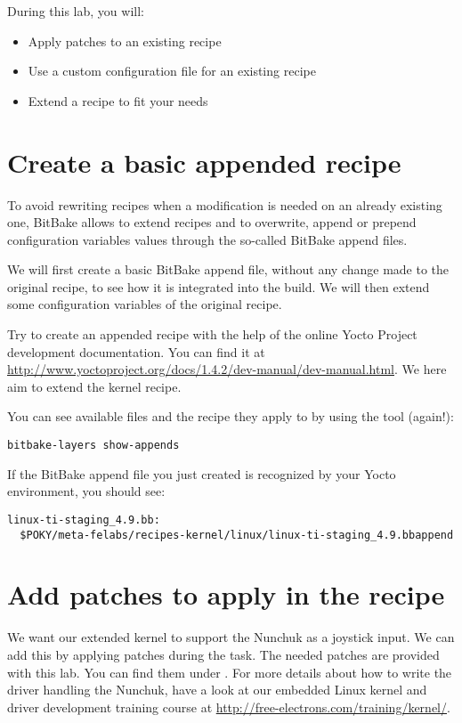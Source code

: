 
During this lab, you will:
\begin{itemize}
  \item Apply patches to an existing recipe
  \item Use a custom configuration file for an existing recipe
  \item Extend a recipe to fit your needs
\end{itemize}

\section{Create a basic appended recipe}

To avoid rewriting recipes when a modification is needed on an already existing
one, BitBake allows to extend recipes and to overwrite, append or prepend
configuration variables values through the so-called BitBake append files.

We will first create a basic BitBake append file, without any change made
to the original recipe, to see how it is integrated into the build. We will then
extend some configuration variables of the original recipe.

Try to create an appended recipe with the help of the online Yocto
Project development documentation. You can find it at
\url{http://www.yoctoproject.org/docs/1.4.2/dev-manual/dev-manual.html}. We here
aim to extend the  kernel recipe.

You can see available  files and the recipe they apply to by
using the  tool (again!):
\begin{verbatim}
bitbake-layers show-appends
\end{verbatim}

If the BitBake append file you just created is recognized by your Yocto
environment, you should see:
\begin{verbatim}
linux-ti-staging_4.9.bb:
  $POKY/meta-felabs/recipes-kernel/linux/linux-ti-staging_4.9.bbappend
\end{verbatim}

\section{Add patches to apply in the recipe}

We want our extended  kernel to support the Nunchuk as
a joystick input. We can add this by applying patches during the
 task. The needed patches are provided with this lab. You can
find them under . For more details about
how to write the driver handling the Nunchuk, have a look at our embedded Linux
kernel and driver development training course at
\url{http://free-electrons.com/training/kernel/}.

